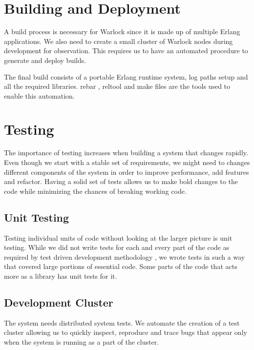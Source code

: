 \section{Building and Deployment}

A build%
process is necessary for Warlock since it is made up of multiple Erlang
applications. We also need to create a small cluster of Warlock nodes during
development for observation. This requires us to have an automated procedure
to generate and deploy builds.

The final build consists of a portable Erlang runtime system, log
paths setup and all the required libraries. rebar \citep{rebar}, reltool
\citep{reltool} and make files \citep{makefiles} are the tools used to enable
this automation.

\section{Testing}
\label{section:impl.testing}

The importance of testing increases when building a system that changes
rapidly. Even though we start with a stable set of requirements, we might
need to changes different components of the system in order to improve
performance, add features and refactor. Having a solid set of tests allows
us to make bold changes to the code while minimizing the chances of breaking
working code.

\subsection{Unit Testing}

Testing individual units of code without looking at the larger picture is unit
testing. While we did not write tests for each and every part of the code as
required by test driven development methodology \citep{Beck:2002:TDD:579193},
we wrote tests in such a way that covered large portions of essential code.
Some parts of the code that acts more as a library has unit tests for it.

\subsection{Development Cluster}

The system needs distributed system tests. We automate the creation of a test
cluster allowing us to quickly inspect, reproduce and trace bugs that appear
only when the system is running as a part of the cluster.

